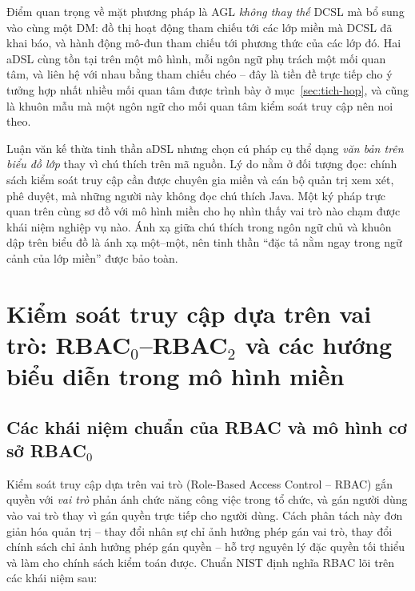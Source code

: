 Điểm quan trọng về mặt phương pháp là AGL \emph{không thay thế} DCSL mà bổ sung vào cùng một DM: đồ thị hoạt động tham chiếu tới các lớp miền mà DCSL đã khai báo, và hành động mô-đun tham chiếu tới phương thức của các lớp đó. Hai aDSL cùng tồn tại trên một mô hình, mỗi ngôn ngữ phụ trách một mối quan tâm, và liên hệ với nhau bằng tham chiếu chéo -- đây là tiền đề trực tiếp cho ý tưởng hợp nhất nhiều mối quan tâm được trình bày ở mục~\ref{sec:tich-hop}, và cũng là khuôn mẫu mà một ngôn ngữ cho mối quan tâm kiểm soát truy cập nên noi theo.

\begin{nhanxet}
Luận văn kế thừa tinh thần aDSL nhưng chọn cú pháp cụ thể dạng \emph{văn bản trên biểu đồ lớp} thay vì chú thích trên mã nguồn. Lý do nằm ở đối tượng đọc: chính sách kiểm soát truy cập cần được chuyên gia miền và cán bộ quản trị xem xét, phê duyệt, mà những người này không đọc chú thích Java. Một ký pháp trực quan trên cùng sơ đồ với mô hình miền cho họ nhìn thấy vai trò nào chạm được khái niệm nghiệp vụ nào. Ánh xạ giữa chú thích trong ngôn ngữ chủ và khuôn dập trên biểu đồ là ánh xạ một--một, nên tinh thần ``đặc tả nằm ngay trong ngữ cảnh của lớp miền'' được bảo toàn.
\end{nhanxet}

\section{Kiểm soát truy cập dựa trên vai trò: RBAC$_0$--RBAC$_2$ và các hướng biểu diễn trong mô hình miền}
\label{sec:rbac}

\subsection{Các khái niệm chuẩn của RBAC và mô hình cơ sở RBAC$_0$}

Kiểm soát truy cập dựa trên vai trò (Role-Based Access Control -- RBAC) \cite{sandhu1996,ferraiolo2001} gắn quyền với \emph{vai trò} phản ánh chức năng công việc trong tổ chức, và gán người dùng vào vai trò thay vì gán quyền trực tiếp cho người dùng. Cách phân tách này đơn giản hóa quản trị -- thay đổi nhân sự chỉ ảnh hưởng phép gán vai trò, thay đổi chính sách chỉ ảnh hưởng phép gán quyền -- hỗ trợ nguyên lý đặc quyền tối thiểu và làm cho chính sách kiểm toán được. Chuẩn NIST \cite{ferraiolo2001} định nghĩa RBAC lõi trên các khái niệm sau:

